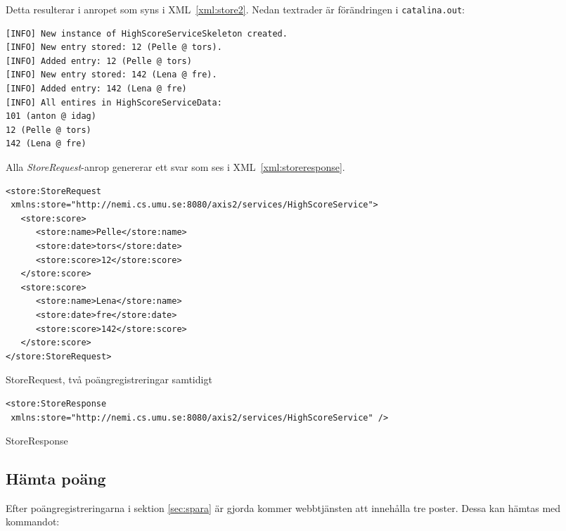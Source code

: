 \documentclass[a4paper, 12pt]{article}
\begin{document}
Detta resulterar i anropet som syns i XML~\ref{xml:store2}. Nedan
textrader är förändringen i \verb!catalina.out!:

\begin{footnotesize}
\begin{verbatim}
[INFO] New instance of HighScoreServiceSkeleton created.
[INFO] New entry stored: 12 (Pelle @ tors).
[INFO] Added entry: 12 (Pelle @ tors)
[INFO] New entry stored: 142 (Lena @ fre).
[INFO] Added entry: 142 (Lena @ fre)
[INFO] All entires in HighScoreServiceData:
101 (anton @ idag)
12 (Pelle @ tors)
142 (Lena @ fre)
\end{verbatim}
\end{footnotesize}

Alla \textit{StoreRequest}-anrop genererar ett svar som ses i
XML~\ref{xml:storeresponse}.

\begin{xml}
  \begin{footnotesize}
\begin{verbatim}
<store:StoreRequest
 xmlns:store="http://nemi.cs.umu.se:8080/axis2/services/HighScoreService">
   <store:score>
      <store:name>Pelle</store:name>
      <store:date>tors</store:date>
      <store:score>12</store:score>
   </store:score>
   <store:score>
      <store:name>Lena</store:name>
      <store:date>fre</store:date>
      <store:score>142</store:score>
   </store:score>
</store:StoreRequest>
\end{verbatim}
  \end{footnotesize}
  \caption{StoreRequest, två poängregistreringar samtidigt}\label{xml:store2}
\end{xml}

\begin{xml}
  \begin{footnotesize}
\begin{verbatim}
<store:StoreResponse
 xmlns:store="http://nemi.cs.umu.se:8080/axis2/services/HighScoreService" />
\end{verbatim}
  \end{footnotesize}
  \caption{StoreResponse}\label{xml:storeresponse}
\end{xml}

\subsection{Hämta poäng}
Efter poäng\-registreringarna i sektion \ref{sec:spara} är gjorda
kommer webbtjänsten att innehålla tre poster. Dessa kan hämtas med
kommandot:
\end{document}
